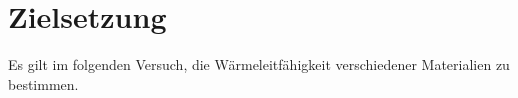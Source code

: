 \section{Zielsetzung}
\label{sec:Zielsetzung}
Es gilt im folgenden Versuch, die Wärmeleitfähigkeit verschiedener Materialien zu bestimmen.
